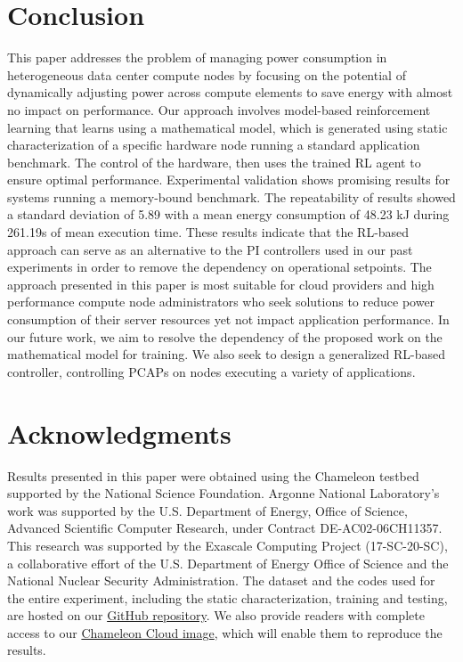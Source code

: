 \section{Conclusion}\label{ch3:sec:Conclusion}
This paper addresses the problem of managing power consumption in heterogeneous data center compute nodes by focusing on the potential of dynamically adjusting power across
compute elements to save energy with almost no impact on performance.
Our approach involves model-based reinforcement learning that learns using a mathematical model, which is generated using static characterization of a specific hardware node running a standard application benchmark. The control of the hardware, then uses the trained RL agent to ensure optimal performance. Experimental validation shows promising results for systems running a memory-bound benchmark. The repeatability of results showed a standard deviation of 5.89 with a mean energy consumption of 48.23 \unit{\kilo \joule} during 261.19\unit{\second} of mean execution time. These results indicate that the RL-based approach can serve as an alternative to the PI controllers used in our past experiments in order to remove the dependency on operational setpoints. The approach presented in this paper is most suitable for cloud providers and high performance compute node administrators who seek solutions to reduce power consumption of their server resources yet not impact application performance. In our future work, we aim to resolve the dependency of the proposed work on the mathematical model for training. We also seek to design a generalized RL-based controller, controlling PCAPs on nodes executing a variety of applications.

\section*{Acknowledgments}\label{sec:Acknowledgments}
Results presented in this paper were obtained using the Chameleon testbed supported by the National Science Foundation.
Argonne National Laboratory's work was supported by the U.S. Department of Energy, Office of Science, Advanced Scientific Computer Research, under Contract DE-AC02-06CH11357. This research was supported by the Exascale Computing Project (17-SC-20-SC), a collaborative effort of the U.S. Department of Energy Office of Science and the National Nuclear Security Administration. The dataset and the codes used for the entire experiment, including the static characterization, training and testing, are hosted on our  \href{https://github.com/akhileshraj91/GENERALIZED_RL_ANL.git}{GitHub repository}. 
We also provide readers with complete access to our \href{https://chi.tacc.chameleoncloud.org/ngdetails/OS::Glance::Image/f6974b54-93fc-4140-9163-7aae9fc3070d}{Chameleon Cloud image}, which will enable them to reproduce the results.


